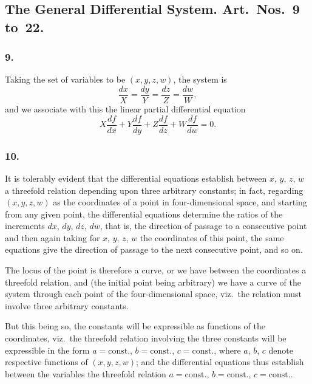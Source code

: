 \documentclass[12pt,a4paper]{article}
\theoremstyle{plain}
\begin{document}
\newpage
\setcounter{page}{118}

\subsection*{The General Differential System. Art.~Nos.~9 to~22.}

\subsubsection*{9.}

Taking the set of variables to be $(x, y, z, w)$, the system is
\[
\frac{dx}{X} = \frac{dy}{Y} = \frac{dz}{Z} = \frac{dw}{W},
\]
and we associate with this the linear partial differential equation
\[
X\frac{df}{dx} + Y\frac{df}{dy} + Z\frac{df}{dz} + W\frac{df}{dw} = 0.
\]

\subsubsection*{10.}

It is tolerably evident that the differential equations establish between $x$, $y$, $z$, $w$ a threefold relation depending upon three arbitrary constants; in fact, regarding $(x, y, z, w)$ as the coordinates of a point in four-dimensional space, and starting from any given point, the differential equations determine the ratios of the increments $dx$, $dy$, $dz$, $dw$, that is, the direction of passage to a consecutive point and then again taking for $x$, $y$, $z$, $w$ the coordinates of this point, the same equations give the direction of passage to the next consecutive point, and so on.

The locus of the point is therefore a curve, or we have between the coordinates a threefold relation, and (the initial point being arbitrary) we have a curve of the system through each point of the four-dimensional space, viz.~the relation must involve three arbitrary constants.

But this being so, the constants will be expressible as functions of the coordinates, viz.~the threefold relation involving the three constants will be expressible in the form $a = \text{const.}$, $b = \text{const.}$, $c = \text{const.}$, where $a$, $b$, $c$ denote respective functions of $(x, y, z, w)$; and the differential equations thus establish between the variables the threefold relation $a = \text{const.}$, $b = \text{const.}$, $c = \text{const.}$.

\newpage
\setcounter{page}{119}
\end{document}
